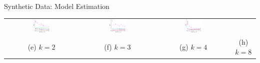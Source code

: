 \documentclass[final,t]{beamer}
\begin{document}
\begin{frame}{}
\begin{columns}[t]
\begin{column}{0.3\linewidth}
\begin{block}{Synthetic Data: Model Estimation}
\begin{center}
\begin{tabular}{cccc}
          \includegraphics[width=0.23\textwidth]{../experiment/figure_new/sp_diff_heter_k_3_view_3-crop} &
          \includegraphics[width=0.23\textwidth]{../experiment/figure_new/sp_diff_heter_k_4_view_1-crop} &
          \includegraphics[width=0.23\textwidth]{../experiment/figure_new/sp_diff_heter_k_8_view_1-crop} \\[-1mm]
          (e) $k=2$ & (f) $k=3$ & (g)  $k=4$ & (h) $k=8$ \\[-1mm]
        \end{tabular}
        \vspace{-2mm}
        \caption{(a)-(d) Mixture of Gaussian distributions with $k=2,3,4,8$. (e)-(h) Mixture of Gaussian/Gamma distribution with $k=2,3,4,8$. }
      \end{center}
    \vspace{-0.3in}
    \end{block}


\end{column}
\end{columns}
\end{frame}
\end{document}
